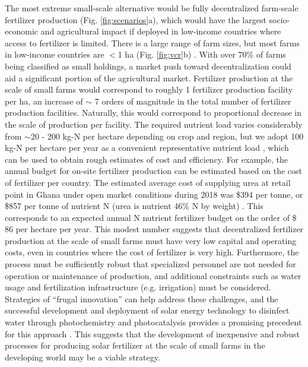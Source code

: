 The most extreme small-scale alternative would be fully decentralized farm-scale fertilizer production (Fig. \ref{fig:scenarios}a), which would have the largest socio-economic and agricultural impact if deployed in low-income countries where access to fertilizer is limited. There is a large range of farm sizes, but most farms in low-income countries are $<$1 ha (Fig. \ref{fig:vcr}b)\cite{Lowder_2016} . With over 70\% of farms being classified as small holdings, a market push toward decentralization could aid a significant portion of the agricultural market. Fertilizer production at the scale of small farms would  correspond to roughly 1 fertilizer production facility per ha, an increase of $\sim$ 7 orders of magnitude in the total number of fertilizer production facilities. Naturally, this would correspond to proportional decrease in the scale of production per facility.
The required nutrient load varies considerably from $\sim$20 - 200 kg-N per hectare depending on crop and region, but we adopt 100 kg-N per hectare per year as a convenient representative nutrient load \cite{Medford_2017}, which can be used to obtain rough estimates of cost and efficiency. For example, the annual budget for on-site fertilizer production can be estimated based on the cost of fertilizer per country. The estimated average cost of supplying urea at retail point in Ghana under open market conditions during 2018 was \$394 per tonne, or \$857 per tonne of nutrient N (urea is nutrient 46\% N by weight) \cite{africa_fert_2017}.
 This corresponds to an expected annual N nutrient fertilizer budget on the order of \$ 86 per hectare per year. This modest number suggests that decentralized fertilizer production at the scale of small farms must have very low capital and operating costs, even in countries where the cost of fertilizer is very high. Furthermore, the process must be sufficiently robust that specialized personnel are not needed for operation or maintenance of production, and additional constraints such as water usage and fertilization infrastructure (e.g. irrigation) must be considered. Strategies of ``frugal innovation'' \cite{Weyrauch_2016} can help address these challenges, and the successful development and deployment of solar energy technology to disinfect water through photochemistry and photocatalysis provides a promising precedent for this approach \cite{Lonnen_2005, McGuigan_2012}.
 This suggests that the development of inexpensive and robust processes for producing solar fertilizer at the scale of small farms in the developing world may be a viable strategy.
 
